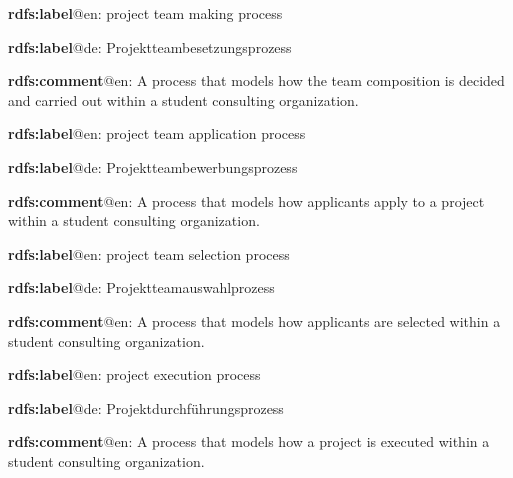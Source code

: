 \documentclass[a4paper, DIV=13, BCOR=0cm]{scrbook}
\begin{document}
\begin{mdframed}[style=onto-3, frametitle={Project\_Team\_Making\_Process}]
	{%
		\begin{compactitem}
			\item \textbf{rdfs:label}@en: project team making process
			\item \textbf{rdfs:label}@de: Projektteambesetzungsprozess
			\item \textbf{rdfs:comment}@en: A process that models how the team composition is decided and carried out within a student consulting organization.
		\end{compactitem}
	} %
\end{mdframed}

\begin{mdframed}[style=onto-4, frametitle={Project\_Team\_Application\_Process}]
	{%
		\begin{compactitem}
			\item \textbf{rdfs:label}@en: project team application process
			\item \textbf{rdfs:label}@de: Projektteambewerbungsprozess
			\item \textbf{rdfs:comment}@en: A process that models how applicants apply to a project within a student consulting organization.
		\end{compactitem}
	} %
\end{mdframed}

\begin{mdframed}[style=onto-4, frametitle={Project\_Team\_Selection\_Process}]
	{%
		\begin{compactitem}
			\item \textbf{rdfs:label}@en: project team selection process
			\item \textbf{rdfs:label}@de: Projektteamauswahlprozess
			\item \textbf{rdfs:comment}@en: A process that models how applicants are selected within a student consulting organization.
		\end{compactitem}
	} %
\end{mdframed}

\begin{mdframed}[style=onto-2, frametitle={Project\_Execution\_Process}]
	{%
		\begin{compactitem}
			\item \textbf{rdfs:label}@en: project execution process
			\item \textbf{rdfs:label}@de: Projektdurchführungsprozess
			\item \textbf{rdfs:comment}@en: A process that models how a project is executed within a student consulting organization.
		\end{compactitem}
	} %
\end{mdframed}
\end{document}

